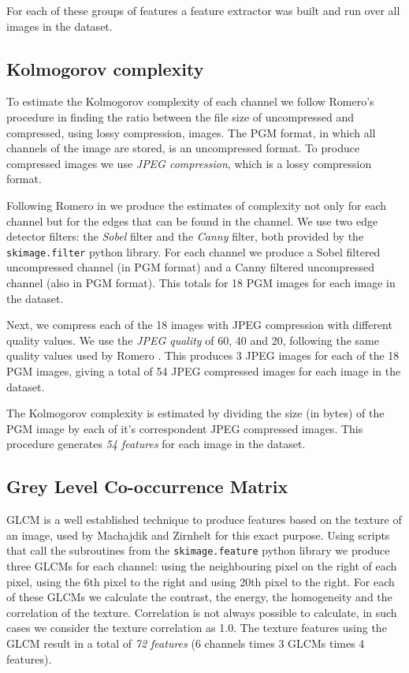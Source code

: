 \documentclass[11pt,a4paper,twoside,openright]{report}
\begin{document}
For each of these groups of features a feature extractor was built and run over
all images in the dataset.

\subsection{Kolmogorov complexity}

To estimate the Kolmogorov complexity of each channel we follow Romero's
procedure \cite{jma12clas} in finding the ratio between the file size of
uncompressed and compressed, using lossy compression, images.  The PGM format,
in which all channels of the image are stored, is an uncompressed format.  To
produce compressed images we use \emph{JPEG compression}, which is a lossy
compression format.

Following Romero in \cite{jma12clas} we produce the estimates of complexity not
only for each channel but for the edges that can be found in the channel.  We
use two edge detector filters: the \emph{Sobel} filter and the \emph{Canny}
filter, both provided by the \texttt{skimage.filter} python library.  For each
channel we produce a Sobel filtered uncompressed channel (in PGM format) and a
Canny filtered uncompressed channel (also in PGM format).  This totals for 18
PGM images for each image in the dataset.

Next, we compress each of the 18 images with JPEG compression with different
quality values.  We use the \emph{JPEG quality} of 60, 40 and 20, following the
same quality values used by Romero \cite{jma12clas}.  This produces 3 JPEG
images for each of the 18 PGM images, giving a total of 54 JPEG compressed
images for each image in the dataset.

The Kolmogorov complexity is estimated by dividing the size (in bytes) of the
PGM image by each of it's correspondent JPEG compressed images.  This procedure
generates \emph{54 features} for each image in the dataset.


\subsection{Grey Level Co-occurrence Matrix}

GLCM is a well established technique to produce features based on the texture
of an image, used by Machajdik \cite{mach10clas} and Zirnhelt
\cite{zirnhelt07art} for this exact purpose.  Using scripts that call the
subroutines from the \texttt{skimage.feature} python library we produce three
GLCMs for each channel: using the neighbouring pixel on the right of each
pixel, using the 6th pixel to the right and using 20th pixel to the right.  For
each of these GLCMs we calculate the contrast, the energy, the homogeneity and
the correlation of the texture.  Correlation is not always possible to
calculate, in such cases we consider the texture correlation as 1.0.  The
texture features using the GLCM result in a total of \emph{72 features} (6
channels times 3 GLCMs times 4 features).
\end{document}
